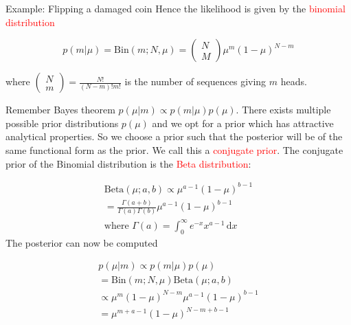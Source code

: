 \begin{example}{Example: Flipping a damaged coin}
        Hence the likelihood is given by the \textcolor{red}{binomial distribution}

        \begin{equation}
            p(m|\mu) = \text{Bin}(m;N,\mu) = \begin{pmatrix} N \\ M \end{pmatrix} \mu^{m}(1-\mu)^{N-m}
        \end{equation}

        where $\begin{pmatrix} N \\ m \end{pmatrix} = \frac{N!} {(N-m)!m!} $ is the number of sequences giving $m$ heads. 

        \vspace{1em}

        Remember Bayes theorem $p(\mu|m) \propto p(m|\mu)p(\mu)$. There exists multiple possible prior distributions $p(\mu)$ and we opt for
        a prior which has attractive analytical properties. So we choose a prior such that the posterior will be of the same functional form as the prior. We call this a \textcolor{red}{conjugate prior}.
        The conjugate prior of the Binomial distribution is the \textcolor{red}{Beta distribution}:
        
       \begin{equation}
       \begin{aligned}
        \text{Beta}(\mu; a,b ) \propto \mu^{a-1} (1-\mu)^{b-1} \\
        = \frac{\Gamma (a+b)} {\Gamma(a)\Gamma(b)} \mu^{a-1}(1-\mu)^{b-1} \\
        \text{where } \Gamma(a) = \int_{0}^{\infty} e^{-x}x^{a-1}\,\text{d}x  
       \end{aligned}
       \end{equation}
       The posterior can now be computed

       \begin{equation}
       \begin{aligned}
        p(\mu|m) \propto p(m|\mu)p(\mu) \\
        = \text{Bin} (m; N, \mu) \text{Beta}(\mu;a,b) \\
        \propto \mu^{m}(1-\mu)^{N-m}\mu^{a-1}(1-\mu)^{b-1} \\
        = \mu^{m+a-1}(1-\mu)^{N-m+b-1}
       \end{aligned}
       \end{equation}


    \end{example}


